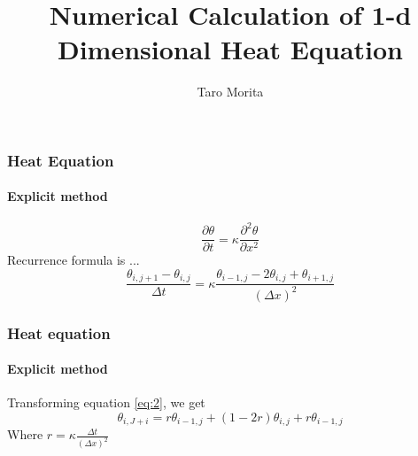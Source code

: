 \documentclass[aspectratio=169]{beamer}
\title{Numerical Calculation of 1-d Dimensional Heat Equation}
\author{Taro Morita}
\begin{document}
\begin{frame}
    \titlepage
\end{frame}

\begin{frame}
    \frametitle{Heat Equation}
    \framesubtitle{Explicit method}
    \begin{equation}
        \frac{\partial \theta}{\partial t} = \kappa \frac{\partial^2 \theta}{\partial x^2}
    \end{equation}
    Recurrence formula is ...
    \begin{equation}
        \frac{\theta_{i, j+1} - \theta_{i, j}}{\Delta t} = \kappa \frac{\theta_{i-1, j} - 2 \theta_{i, j} + \theta_{i+1, j}}{(\Delta x)^2}
        \label{eq:2}
    \end{equation}
\end{frame}

\begin{frame}
    \frametitle{Heat equation}
    \framesubtitle{Explicit method}
    Transforming equation \ref{eq:2}, we get
    \begin{equation}
        \theta_{i, J+i} = r \theta_{i-1, j} + (1 - 2 r) \theta_{i, j} + r \theta_{i-1, j}
    \end{equation}
    Where $r = \kappa \displaystyle{\frac{\Delta t}{(\Delta x)^2}}$
\end{frame}
\end{document}

